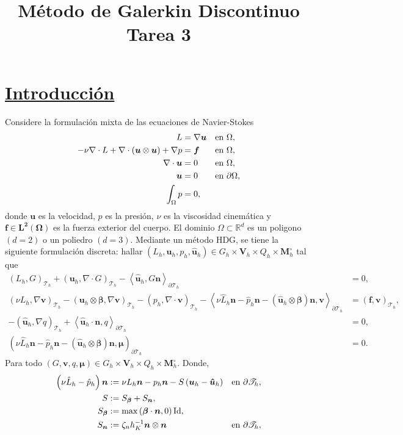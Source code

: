 \documentclass[10pt,a4paper]{report}
\title{\color{azul}\textbf{Método de Galerkin Discontinuo}\\
	\textbf{Tarea 3}}
\author{\color{azul}\autor}
\date{\color{azul}\fecha}
\newcommand{\bs}{\boldsymbol}
\newcommand{\Th}{\mathscr{T}_{h}}
\providecommand{\PI}[2]{\left\langle #1,#2  \right\rangle}
\providecommand{\Pii}[2]{\left( #1,#2  \right)}
\begin{document}
	\section*{\underline{Introducción}}
	Considere la formulación mixta de las ecuaciones de Navier-Stokes
	\begin{align*}
		L &= \nabla \bs{u}  &&\textup{en} \ \Omega, \\
		-\nu \nabla\cdot L + \nabla\cdot\left(\bs{u}\otimes \bs{u} \right) + \nabla p &= \bs{f}  &&\textup{en}\ \Omega,\\
		\nabla\cdot \bs{u} &= 0  &&\textup{en}\ \Omega,\\
		\bs{u} &= 0   &&\textup{en}\ \partial\Omega,\\
		\int_{\Omega} p &= 0,
	\end{align*}
	donde $\bs{u}$ es la velocidad, $p$ es la presión, $\nu$ es la viscosidad cinemática y $\bs{f}\in \bs{L^{2}\left(\Omega\right)}$ es la fuerza exterior del cuerpo. El dominio $\Omega\subset\mathbb{R}^{d}$ es un poligono $(d=2)$ o un poliedro $(d=3)$. Mediante un método HDG, se tiene la siguiente formulación discreta: hallar $\left(L_{h},\bs{u}_{h},p_{h},\bs{\hat{u}}_{h}\right)\in G_{h}\times\bs{V}_{h}\times Q_{h}\times \bs{M}^{\circ}_{h}$ tal que 
	\begin{align}
		\Pii{L_{h}}{G}_{\Th} + \Pii{\bs{u}_{h}}{\nabla\cdot G}_{\Th} - \PI{\bs{\hat{u}}_{h}}{G\bs{n}}_{\partial\Th} &= 0,\label{eq:FDHDGA}\\
		\Pii{\nu L_{h}}{\nabla\bs{v}}_{\Th} - \Pii{\bs{u}_{h}\otimes\bs{\beta}}{\nabla \bs{v}}_{\Th} - \Pii{p_{h}}{\nabla\cdot\bs{v}}_{\Th} - \PI{\nu\hat{L}_{h}\bs{n}-\hat{p}_{h}\bs{n}-\left(\bs{\hat{u}}_{h}\otimes\bs{\beta}\right)\bs{n}}{\bs{v}}_{\partial\Th} &= \Pii{\bs{f}}{\bs{v}}_{\Th},\label{eq:FDHDGB}\\
		-\Pii{\bs{\hat{u}}_{h}}{\nabla q}_{\Th} + \PI{\bs{\hat{u}}_{h}\cdot \bs{n}}{q}_{\partial\Th} &= 0,\label{eq:FDHDGC}\\
		\Pii{\nu\hat{L}_{h}\bs{n} - \hat{p}_{h}\bs{n} - \left(\bs{\hat{u}}_{h}\otimes\bs{\beta}\right)\bs{n}}{\bs{\mu}}_{\partial\Th} &= 0.\label{eq:FDHDGD}
	\end{align}
	Para todo $\left(G,\bs{v},q,\bs{\mu}\right)\in G_{h}\times\bs{V}_{h}\times Q_{h}\times \bs{M}^{\circ}_{h}$. Donde,
	\begin{align*}
		\left(\nu\hat{L}_{h}-\hat{p}_{h}\right)\bs{n} &:= \nu L_{h}\bs{n} - p_{h}\bs{n} - S\left(\bs{u}_{h} - \bs{\hat{u}}_{h}\right) &&\textup{en}\ \partial\Th,\\
		S &:= S_{\bs{\beta}} + S_{\bs{n}},\\
		S_{\bs{\beta}} &:= \max\left(\bs{\beta}\cdot\bs{n},0\right)\textup{Id},\\
		S_{\bs{n}} &:= \zeta_{n} h^{-1}_{K}\bs{n}\otimes\bs{n}  &&\textup{en}\ \partial\Th,
	\end{align*} 
\end{document}
